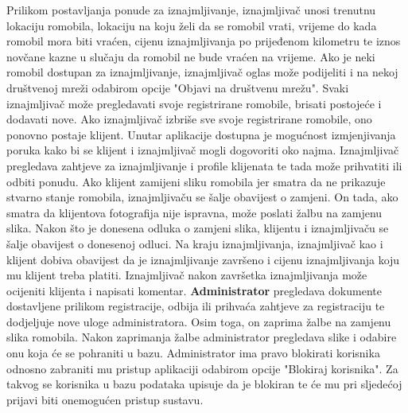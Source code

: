 		Prilikom postavljanja ponude za iznajmljivanje, iznajmljivač unosi trenutnu lokaciju romobila, lokaciju na koju želi da se romobil vrati, vrijeme do kada romobil mora biti vraćen, cijenu iznajmljivanja po prijeđenom kilometru te iznos novčane kazne u slučaju da romobil ne bude vraćen na vrijeme. Ako je neki romobil dostupan za iznajmljivanje, iznajmljivač oglas može podijeliti i na nekoj društvenoj mreži odabirom opcije "Objavi na društvenu mrežu". Svaki iznajmljivač može pregledavati svoje registrirane romobile, brisati postojeće i dodavati nove. Ako iznajmljivač izbriše sve svoje registrirane romobile, ono ponovno postaje klijent. Unutar aplikacije dostupna je mogućnost izmjenjivanja poruka kako bi se klijent i iznajmljivač mogli dogovoriti oko najma. Iznajmljivač pregledava zahtjeve za iznajmljivanje i profile klijenata te tada može prihvatiti ili odbiti ponudu. Ako klijent zamijeni sliku romobila jer smatra da ne prikazuje stvarno stanje romobila, iznajmljivaču se šalje obavijest o zamjeni. On tada, ako smatra da klijentova fotografija nije ispravna, može poslati žalbu na zamjenu slika. Nakon što je donesena odluka o zamjeni slika, klijentu i iznajmljivaču se šalje obavijest o donesenoj odluci. Na kraju iznajmljivanja, iznajmljivač kao i klijent dobiva obavijest da je iznajmljivanje završeno i cijenu iznajmljivanja koju mu klijent treba platiti. Iznajmljivač nakon završetka iznajmljivanja može ocijeniti klijenta i napisati komentar. \textbf{Administrator} pregledava dokumente dostavljene prilikom registracije, odbija ili prihvaća zahtjeve za registraciju te dodjeljuje nove uloge administratora. Osim toga, on zaprima žalbe na zamjenu slika romobila. Nakon zaprimanja žalbe administrator pregledava slike i odabire onu koja će se pohraniti u bazu. Administrator ima pravo blokirati korisnika odnosno zabraniti mu pristup aplikaciji odabirom opcije "Blokiraj korisnika". Za takvog se korisnika u bazu podataka upisuje da je blokiran te će mu pri sljedećoj prijavi biti onemogućen pristup sustavu.
		\newline
		\newline
